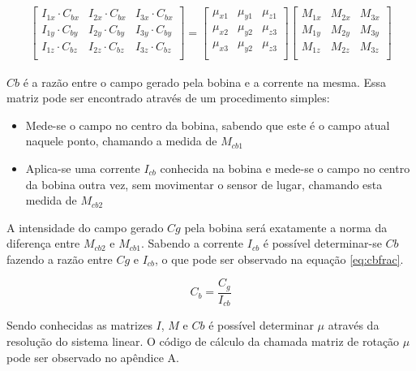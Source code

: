 \begin{gather}
\label{eq:rotB}
 \begin{bmatrix} I_{1x}\cdot C_{bx} & I_{2x}\cdot C_{bx} & I_{3x}\cdot C_{bx} \\
 I_{1y}\cdot C_{by} & I_{2y}\cdot C_{by} & I_{3y}\cdot C_{by} \\
 I_{1z}\cdot C_{bz} & I_{2z}\cdot C_{bz} & I_{3z}\cdot C_{bz} \\
 \end{bmatrix}
 =
   \begin{bmatrix}
   \mu_{x1} & \mu_{y1} & \mu_{z1} \\
   \mu_{x2} & \mu_{y2} & \mu_{z3} \\
   \mu_{x3} & \mu_{y2} & \mu_{z3} \\
   \end{bmatrix}
    \begin{bmatrix}
   M_{1x} & M_{2x} & M_{3x} \\
   M_{1y} & M_{2y} & M_{3y} \\
   M_{1z} & M_{2z} & M_{3z} \\
   \end{bmatrix}
\end{gather}

$Cb$ é a razão entre o campo gerado pela bobina e a corrente na mesma. Essa matriz pode ser encontrado através de um procedimento simples:

\begin{itemize}
    \item Mede-se o campo no centro da bobina, sabendo que este é o campo atual naquele ponto, chamando a medida de $M_{cb1}$
    \item Aplica-se uma corrente $I_{cb}$ conhecida na bobina e mede-se o campo no centro da bobina outra vez, sem movimentar o sensor de lugar, chamando esta medida de $M_{cb2}$
\end{itemize}

A intensidade do campo gerado $Cg$ pela bobina será exatamente a norma da diferença entre $M_{cb2}$ e $M_{cb1}$. Sabendo a corrente $I_{cb}$ é possível determinar-se $Cb$ fazendo a razão entre $Cg$ e $I_{cb}$, o que pode ser observado na equação \ref{eq:cbfrac}.

\begin{equation}
    \label{eq:cbfrac}
    C_b = \frac{C_g}{I_{cb}}
\end{equation}

Sendo conhecidas as matrizes $I$, $M$ e $Cb$ é possível determinar $\mu$ através da resolução do sistema linear. O código de cálculo da chamada matriz de rotação $\mu$ pode ser observado no apêndice A.

